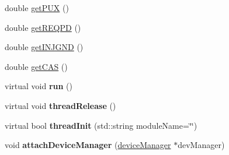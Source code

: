 \begin{DoxyCompactItemize}
\item 
double \hyperlink{classdevice2yarp_a17cabe5685326832b143a95bc079fce2}{get\-P\-U\-X} ()
\item 
double \hyperlink{classdevice2yarp_ad9668df280f370362a6be3d020766b53}{get\-R\-E\-Q\-P\-D} ()
\item 
double \hyperlink{classdevice2yarp_a71d866e65c1a1da500cde870fc9a4202}{get\-I\-N\-J\-G\-N\-D} ()
\item 
double \hyperlink{classdevice2yarp_a2695a28ec3a0864fd1f16bf58b757338}{get\-C\-A\-S} ()
\item 
\hypertarget{classdevice2yarp_a2edb15ab91293f60b5ba2426ae247e1e}{virtual void {\bfseries run} ()}\label{classdevice2yarp_a2edb15ab91293f60b5ba2426ae247e1e}

\item 
\hypertarget{classdevice2yarp_a684963ad891d4dc4e19c5128c88bfff0}{virtual void {\bfseries thread\-Release} ()}\label{classdevice2yarp_a684963ad891d4dc4e19c5128c88bfff0}

\item 
\hypertarget{classdevice2yarp_a900e8d97564445ea12e8d11448197f4a}{virtual bool {\bfseries thread\-Init} (std\-::string module\-Name=\char`\"{}\char`\"{})}\label{classdevice2yarp_a900e8d97564445ea12e8d11448197f4a}

\item 
\hypertarget{classdevice2yarp_ad969527a6d59bcfb1be6349a80defa13}{void {\bfseries attach\-Device\-Manager} (\hyperlink{classdeviceManager}{device\-Manager} $\ast$dev\-Manager)}\label{classdevice2yarp_ad969527a6d59bcfb1be6349a80defa13}

\end{DoxyCompactItemize}


